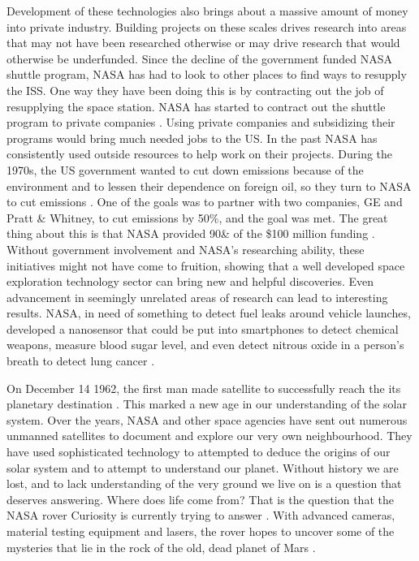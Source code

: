 \documentclass[a4paper,12pt]{article}
\begin{document}
Development of these technologies also brings about a massive amount of money into private industry. Building projects on these scales drives research into areas that may not have been researched otherwise or may drive research that would otherwise be underfunded. Since the decline of the government funded NASA shuttle program, NASA has had to look to other places to find ways to resupply the ISS. One way they have been doing this is by contracting out the job of resupplying the space station. NASA has started to contract out the shuttle program to private companies \autocite{woodsbrian}. Using private companies and subsidizing their programs would bring much needed jobs to the US. In the past NASA has consistently used outside resources to help work on their projects. During the 1970s, the US government wanted to cut down emissions because of the environment and to lessen their dependence on foreign oil, so they turn to NASA to cut emissions \autocite{reddy2013}. One of the goals was to partner with two companies, GE and Pratt \& Whitney, to cut emissions by 50\%, and the goal was met. The great thing about this is that NASA provided 90\& of the \$100 million funding \autocite{reddy2013}. Without government involvement and NASA's researching ability, these initiatives might not have come to fruition, showing that a well developed space exploration technology sector can bring new and helpful discoveries. Even advancement in seemingly unrelated areas of research can lead to interesting results. NASA, in need of something to detect fuel leaks around vehicle launches, developed a nanosensor that could be put into smartphones to detect chemical weapons, measure blood sugar level, and even detect nitrous oxide in a person's breath to detect lung cancer \autocite{times2002}.   

On December 14 1962, the first man made satellite to successfully reach the its planetary destination \autocite{david2012}. This marked a new age in our understanding of the solar system. Over the years, NASA and other space agencies have sent out numerous unmanned satellites to document and explore our very own neighbourhood. They have used sophisticated technology to attempted to deduce the origins of our solar system and to attempt to understand our planet. Without history we are lost, and to lack understanding of the very ground we live on is a question that deserves answering. Where does life come from? That is the question that the NASA rover Curiosity is currently trying to answer \autocite{gross2012}. With advanced cameras, material testing equipment and lasers, the rover hopes to uncover some of the mysteries that lie in the rock of the old, dead planet of Mars \autocite{gross2012}.
\end{document}
